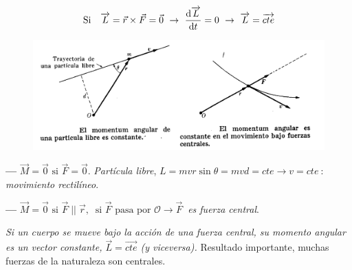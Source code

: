 $$\text{Si } \ \ \overrightarrow{L}=\vec r \times \vec F = \vec 0 \ \to \ \displaystyle \dv{\overrightarrow{L}}{t}=0 \ \to \ \overrightarrow{L}=\overrightarrow{cte}$$ 


\begin{figure}[H]
	\centering
	\includegraphics[width=1\textwidth]{imagenes/imagenes04/T04IM20.png}
\end{figure}


\begin{miparrafo}
	
	\textbf{---} $\overrightarrow{M}=\vec 0 \text { si } \vec F=\vec 0$. \emph{Partícula libre}, $L=mvr\sin \theta =mvd=cte \to v=cte \ : \ $ \emph{movimiento rectilíneo}.
	
	\textbf{---} $\overrightarrow{M}=\vec 0 \text { si } \vec F \;||\; \vec r,\ \text{ si } \vec F \text{ pasa por } \mathcal O \to \vec F \ $ \emph{es fuerza central}.

	\emph{Si un cuerpo se mueve bajo la acción de una fuerza central, su momento angular es un vector constante, $\overrightarrow{L}=\overrightarrow{cte}$ (y viceversa).} \textsf{Resultado importante, muchas fuerzas de la naturaleza son centrales.}

\end{miparrafo}	


